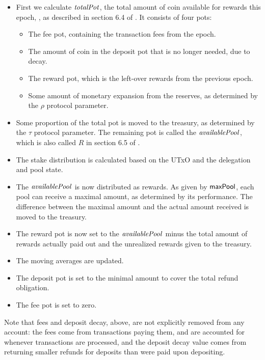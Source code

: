 \begin{itemize}
  \item First we calculate $\mathit{totalPot}$, the total amount of coin available for rewards this epoch,
    , as described in section 6.4 of \cite{delegation_design}. It consists of four pots:
    \begin{itemize}
      \item The fee pot, containing the transaction fees from the epoch.
      \item The amount of coin in the deposit pot that is no longer needed, due to decay.
      \item The reward pot, which is the left-over rewards from the previous epoch.
      \item Some amount of monetary expansion from the reserves, as determined by the
        $\rho$ protocol parameter.
    \end{itemize}
  \item Some proportion of the total pot is moved to the treasury,
    as determined by the $\tau$ protocol parameter. The remaining pot is called the
    $\mathit{availablePool}$, which is also called $R$ in section 6.5 of \cite{delegation_design}.
  \item The stake distribution is calculated based on the UTxO and the delegation and pool state.
  \item The $\mathit{availablePool}$ is now distributed as rewards. As given by $\mathsf{maxPool}$,
    each pool can receive a maximal amount, as determined by its performance.
    The difference between the maximal amount and the actual amount received is
    moved to the treasury.
  \item The reward pot is now set to the $\mathit{availablePool}$ minus the total amount of rewards
    actually paid out and the unrealized rewards given to the treasury.
  \item The moving averages are updated.
  \item The deposit pot is set to the minimal amount to cover the total refund obligation.
  \item The fee pot is set to zero.
\end{itemize}

Note that fees and deposit decay, above, are not explicitly removed from any account:
the fees come from transactions paying them, and are accounted for whenever
transactions are processed, and the deposit decay value comes from returning
smaller refunds for deposits than were paid upon depositing.

